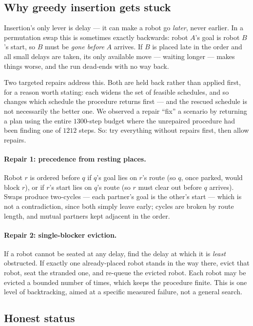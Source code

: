 \documentclass[11pt,a4paper]{article}
\begin{document}
\subsection{Why greedy insertion gets stuck}

Insertion's only lever is delay --- it can make a robot go \emph{later}, never earlier. In a
permutation swap this is sometimes exactly backwards: robot $A$'s goal is robot $B$'s start,
so $B$ must be \emph{gone before} $A$ arrives. If $B$ is placed late in the order and all
small delays are taken, its only available move --- waiting longer --- makes things worse,
and the run dead-ends with no way back.

Two targeted repairs address this. Both are held back rather than applied first, for a
reason worth stating: each widens the set of feasible schedules, and so changes which
schedule the procedure returns first --- and the rescued schedule is not necessarily the
better one. We observed a repair ``fix'' a scenario by returning a plan using the entire
$1300$-step budget where the unrepaired procedure had been finding one of $1212$ steps. So:
try everything without repairs first, then allow repairs.

\paragraph{Repair 1: precedence from resting places.} Robot $r$ is ordered before $q$ if
$q$'s goal lies on $r$'s route (so $q$, once parked, would block $r$), or if $r$'s start lies
on $q$'s route (so $r$ must clear out before $q$ arrives). Swaps produce two-cycles --- each
partner's goal is the other's start --- which is not a contradiction, since both simply
leave early; cycles are broken by route length, and mutual partners kept adjacent in the
order.

\paragraph{Repair 2: single-blocker eviction.} If a robot cannot be seated at any delay, find
the delay at which it is \emph{least} obstructed. If exactly one already-placed robot stands
in the way there, evict that robot, seat the stranded one, and re-queue the evicted robot.
Each robot may be evicted a bounded number of times, which keeps the procedure finite. This
is one level of backtracking, aimed at a specific measured failure, not a general search.

\subsection{Honest status}
\end{document}
